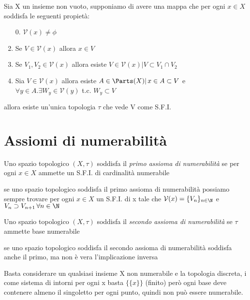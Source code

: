 \documentclass[a4paper]{article}
\begin{document}
\begin{prop}
Sia X un insieme non vuoto, supponiamo di avere una mappa
che per ogni $x \in X$ soddisfa le seguenti propietà:
	\begin{enumerate}
	\item[0.] $\mathcal{V}(x) \neq \phi $
	\item Se $V \in \mathcal{V}(x)$ allora $x \in V$
	\item Se $V_1 , V_2 \in \mathcal{V}(x) $ allora esiste $ V \in \mathcal{V}(x) | V \subset V_1 \cap V_2 $ 
	\item Sia $V \in \mathcal{V}(x) $ allora esiste $ A \in \Parts (X) | \, x \in A \subset V $ e $ \forall y \in A . \exists W_y \in \mathcal{V}(y) $ t.c. $ W_y \subset V $
	\end{enumerate}
allora esiste un'unica topologia $\tau $ che vede V come S.F.I.
\end{prop}

\section{Assiomi di numerabilità}

\begin{deff} Uno spazio topologico $(X, \tau ) $ soddisfa il \emph{primo assioma di numerabilità} se per ogni $x \in X$ ammette un S.F.I. di cardinalità numerabile
\end{deff}

\begin{oss} se uno spazio topologico soddisfa il primo assioma di numerabilità possiamo sempre trovare per ogni $x \in X$ un S.F.I. di x tale che $\mathcal{V}(x) = \{ V_n \}_{n \in \N } $ e $ V_n \supset V_{n+1} \, \forall n \in \N $
\end{oss}

\begin{deff} Uno spazio topologico $(X, \tau )$ soddisfa il \emph{secondo assioma di numerabilità} se $\tau $ ammette base numerabile 
\end{deff}

\begin{lem} se uno spazio topologico soddisfa il secondo assioma di numerabilità soddisfa anche il primo, ma non è vera l'implicazione inversa
\end{lem}

\begin{ex} Basta considerare un qualsiasi insieme X non numerabile e la topologia discreta, i come sistema di intorni per ogni x basta $\{ \{x \} \} $ (finito) però ogni base deve contenere almeno il singoletto per ogni punto, quindi non può essere numerabile.
\end{ex}
\end{document}
